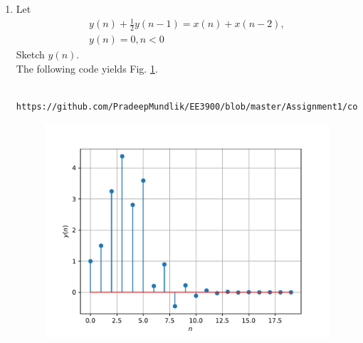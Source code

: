 \documentclass[journal,12pt,twocolumn]{IEEEtran}
\renewcommand\thesection{\arabic{section}}
\begin{document}
\begin{enumerate}[label=\thesection.\arabic*,ref=\thesection.\theenumi]
\item Let
\begin{multline}
\label{eq:iir_filter}
y(n) + \frac{1}{2}y(n-1) = x(n) + x(n-2), 
\\
 y(n) = 0, n < 0
\end{multline}
Sketch $y(n)$.
\\
\solution The following code yields Fig. \ref{fig:yn}.
\begin{lstlisting}
     https://github.com/PradeepMundlik/EE3900/blob/master/Assignment1/codes/q3/yn.py
\end{lstlisting}
\begin{figure}[!ht]
\begin{center}
\includegraphics[width=\columnwidth]{figs/q3/yn.pdf}
\end{center}
\label{fig:yn}	
\end{figure}
\end{enumerate}
\end{document}
